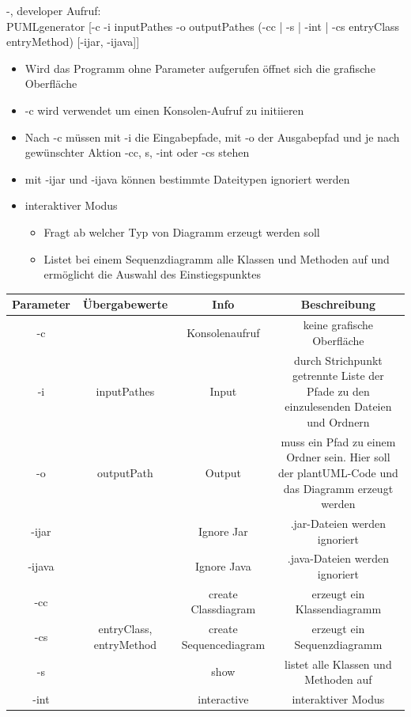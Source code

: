 \documentclass[twoside]{report}
\begin{document}
\begin{shownto}{-, developer}
Aufruf:\\
PUMLgenerator [-c -i inputPathes -o outputPathes (-cc | -s | -int | -cs entryClass entryMethod) [-ijar, -ijava]]

\begin{itemize}
\item Wird das Programm ohne Parameter aufgerufen öffnet sich die grafische Oberfläche
\item -c wird verwendet um einen Konsolen-Aufruf zu initiieren
\item  Nach -c müssen mit -i die Eingabepfade, mit -o der Ausgabepfad und je nach gewünschter Aktion -cc, s, -int oder -cs stehen
\item mit -ijar und -ijava können bestimmte Dateitypen ignoriert werden
\item interaktiver Modus
\begin{itemize}
\item Fragt ab welcher Typ von Diagramm erzeugt werden soll
\item Listet bei einem Sequenzdiagramm alle Klassen und Methoden auf und ermöglicht die Auswahl des Einstiegspunktes
\end{itemize}
\end{itemize}

\begin{tabular}{|c|c|c|c|}
\hline 
Parameter & Übergabewerte & Info & Beschreibung \\ 
\hline 
-c & & Konsolenaufruf & keine grafische Oberfläche \\ 
\hline 
-i & inputPathes & Input & durch Strichpunkt getrennte Liste der Pfade zu den einzulesenden Dateien und Ordnern \\ 
\hline 
-o & outputPath & Output & muss ein Pfad zu einem Ordner sein. Hier soll der plantUML-Code und das Diagramm erzeugt werden \\ 
\hline 
-ijar & & Ignore Jar & .jar-Dateien werden ignoriert \\ 
\hline 
-ijava & & Ignore Java & .java-Dateien werden ignoriert \\ 
\hline 
-cc & & create Classdiagram & erzeugt ein Klassendiagramm \\ 
\hline
-cs & entryClass, entryMethod & create Sequencediagram & erzeugt ein Sequenzdiagramm \\
-s & & show & listet alle Klassen und Methoden auf \\
-int & & interactive & interaktiver Modus \\
\hline 
\end{tabular} 


\nsecend
\end{shownto} %
\end{document}

